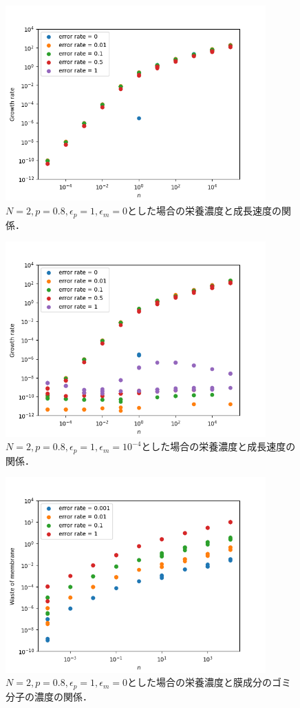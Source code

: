 \documentclass[a4paper,11pt]{jsarticle}
\begin{document}
\begin{figure}[htbp]
  \centering
  \includegraphics[width=10cm]{waste_N2_T5_p08_ep1_em0_ng.png}
  \caption{$N=2,p=0.8,\epsilon_p = 1, \epsilon_m = 0$とした場合の栄養濃度と成長速度の関係．}
  \label{fig:ep1_em0_ng}
\end{figure}

\begin{figure}[htbp]
  \centering
  \includegraphics[width=10cm]{waste_N2_T5_p08_ep1_em4_ng.png}
  \caption{$N=2,p=0.8,\epsilon_p = 1, \epsilon_m = 10^{-4}$とした場合の栄養濃度と成長速度の関係．}
  \label{fig:ep1_em04_ng}
\end{figure}

\begin{figure}[htbp]
  \centering
  \includegraphics[width=10cm]{waste_N2_T5_p08_ep1_em0.png}
  \caption{$N=2,p=0.8,\epsilon_p = 1, \epsilon_m = 0$とした場合の栄養濃度と膜成分のゴミ分子の濃度の関係．}
  \label{fig:ep1_em0}
\end{figure}
\end{document}
